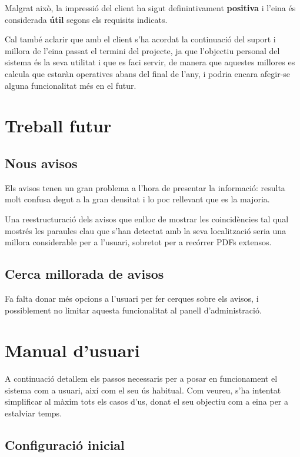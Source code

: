 \documentclass{article}
\begin{document}
Malgrat això, la impressió del client ha sigut definintivament \textbf{positiva} i l'eina és considerada \textbf{útil} segons els requisits indicats.

Cal també aclarir que amb el client s'ha acordat la continuació del suport i millora de l'eina passat el termini del projecte, ja que l'objectiu personal del sistema és la seva utilitat i que es faci servir, de manera que aquestes millores es calcula que estaràn operatives abans del final de l'any, i podria encara afegir-se alguna funcionalitat més en el futur.

\newpage

\section{Treball futur}

\subsection{Nous avisos}

Els avisos tenen un gran problema a l'hora de presentar la informació: resulta molt confusa degut a la gran densitat i lo poc rellevant que es la majoria.

Una reestructuració dels avisos que enlloc de mostrar les coincidències tal qual mostrés les paraules clau que s'han detectat amb la seva localització seria una millora considerable per a l'usuari, sobretot per a recórrer PDFs extensos.

\subsection{Cerca millorada de avisos}

Fa falta donar més opcions a l'usuari per fer cerques sobre els avisos, i possiblement no limitar aquesta funcionalitat al panell d'administració.

\newpage

\section{Manual d'usuari}

A continuació detallem els passos necessaris per a posar en funcionament el sistema com a usuari, així com el seu ús habitual. Com veureu, s'ha intentat simplificar al màxim tots els casos d'us, donat el seu objectiu com a eina per a estalviar temps.

\subsection{Configuració inicial}
\end{document}
